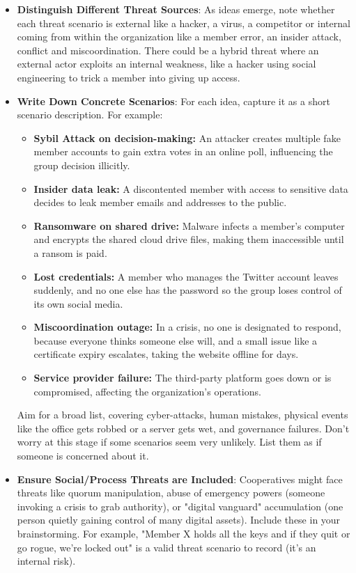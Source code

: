 \begin{itemize}
    \item \textbf{Distinguish Different Threat Sources}:
    As ideas emerge, note whether each threat scenario is external like a
    hacker, a virus, a competitor or internal coming from within the organization
    like a member error, an insider attack, conflict and miscoordination. There could
    be a hybrid threat where an external actor exploits an internal weakness, like
    a hacker using social engineering to trick a member into giving up access.

    \item \textbf{Write Down Concrete Scenarios}:
    For each idea, capture it as a short scenario description.
    For example:

    \begin{itemize}
        \item \textbf{Sybil Attack on decision-making:} An attacker creates multiple fake member
        accounts to gain extra votes in an online poll, influencing the group decision illicitly.
        \item \textbf{Insider data leak:} A discontented member with access to sensitive data decides
        to leak member emails and addresses to the public.
        \item \textbf{Ransomware on shared drive:} Malware infects a member's computer and encrypts the
        shared cloud drive files, making them inaccessible until a ransom is paid.
        \item \textbf{Lost credentials:} A member who manages the Twitter account leaves suddenly, and
        no one else has the password so the group loses control of its own social media.
        \item \textbf{Miscoordination outage:} In a crisis, no one is designated to respond, because everyone
        thinks someone else will, and a small issue like a certificate expiry escalates, taking the website
        offline for days.
        \item \textbf{Service provider failure:} The third-party platform goes
        down or is compromised, affecting the organization's operations.
    \end{itemize}

    Aim for a broad list, covering cyber-attacks, human mistakes, physical events
    like the office gets robbed or a server gets wet, and governance failures. Don't
    worry at this stage if some scenarios seem very unlikely. List them as if someone
    is concerned about it.

    \item \textbf{Ensure Social/Process Threats are Included}:
    Cooperatives might face threats like quorum manipulation, abuse of emergency powers
    (someone invoking a crisis to grab authority), or "digital vanguard" accumulation (one person
    quietly gaining control of many digital assets). Include these in
    your brainstorming. For example, "Member X holds all the keys and if they quit
    or go rogue, we're locked out" is a valid threat scenario to record (it's an
    internal risk).

\end{itemize}

